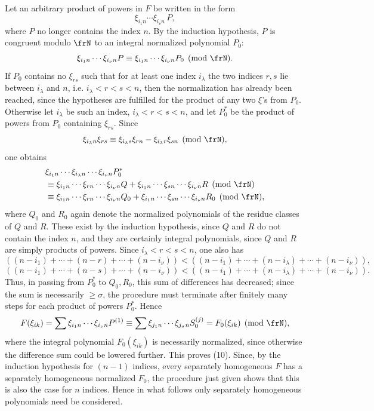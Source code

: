 \documentclass[11pt]{article}
\begin{document}
Let an arbitrary product of powers in \(F\) be written in the form
\[
        \xi_{i_1n}\cdots\xi_{i_\nu n}\,P,
\]
where \(P\) no longer contains the index \(n\). By the induction hypothesis, \(P\) is congruent modulo \(\frN\) to an integral normalized polynomial \(P_0\):
\[
        \xi_{i_1n}\cdots\xi_{i_\nu n}P
        \equiv
        \xi_{i_1n}\cdots\xi_{i_\nu n}P_0
        \pmod{\frN}.
\]
If \(P_0\) contains no \(\xi_{rs}\) such that for at least one index \(i_\lambda\) the two indices \(r,s\) lie between \(i_\lambda\) and \(n\), i.e. \(i_\lambda<r<s<n\), then the normalization has already been reached, since the hypotheses are fulfilled for the product of any two \(\xi\)'s from \(P_0\). Otherwise let \(i_\lambda\) be such an index, \(i_\lambda<r<s<n\), and let \(P_0^*\) be the product of powers from \(P_0\) containing \(\xi_{rs}\). Since
\[
        \xi_{i_\lambda n}\xi_{rs}\equiv
        \xi_{i_\lambda s}\xi_{rn}-\xi_{i_\lambda r}\xi_{sn}
        \pmod{\frN},
\]
one obtains
\begin{align*}
 &\xi_{i_1n}\cdots\xi_{i_\lambda n}\cdots\xi_{i_\nu n}P_0^*\\
 &\equiv
 \xi_{i_1n}\cdots\xi_{rn}\cdots\xi_{i_\nu n}Q
 +
 \xi_{i_1n}\cdots\xi_{sn}\cdots\xi_{i_\nu n}R
 \pmod{\frN}\\
 &\equiv
 \xi_{i_1n}\cdots\xi_{rn}\cdots\xi_{i_\nu n}Q_0
 +
 \xi_{i_1n}\cdots\xi_{sn}\cdots\xi_{i_\nu n}R_0
 \pmod{\frN},
\end{align*}
where \(Q_0\) and \(R_0\) again denote the normalized polynomials of the residue classes of \(Q\) and \(R\). These exist by the induction hypothesis, since \(Q\) and \(R\) do not contain the index \(n\), and they are certainly integral polynomials, since \(Q\) and \(R\) are simply products of powers. Since \(i_\lambda<r<s<n\), one also has
\[
 ((n-i_1)+\cdots+(n-r)+\cdots+(n-i_\nu))
 <
 ((n-i_1)+\cdots+(n-i_\lambda)+\cdots+(n-i_\nu)),
\]
\[
 ((n-i_1)+\cdots+(n-s)+\cdots+(n-i_\nu))
 <
 ((n-i_1)+\cdots+(n-i_\lambda)+\cdots+(n-i_\nu)).
\]
Thus, in passing from \(P_0^*\) to \(Q_0,R_0\), this sum of differences has decreased; since the sum is necessarily \(\ge\sigma\), the procedure must terminate after finitely many steps for each product of powers \(P_0^*\). Hence
\[
        F(\xi_{ik})
        =
        \sum \xi_{i_1n}\cdots\xi_{i_\nu n}P^{(1)}
        \equiv
        \sum \xi_{j_1n}\cdots\xi_{j_\sigma n}S_0^{(j)}
        =
        F_0(\xi_{ik})\pmod{\frN},
\]
where the integral polynomial \(F_0(\xi_{ik})\) is necessarily normalized, since otherwise the difference sum could be lowered further. This proves (10). Since, by the induction hypothesis for \((n-1)\) indices, every separately homogeneous \(F\) has a separately homogeneous normalized \(F_0\), the procedure just given shows that this is also the case for \(n\) indices. Hence in what follows only separately homogeneous polynomials need be considered.
\end{document}
